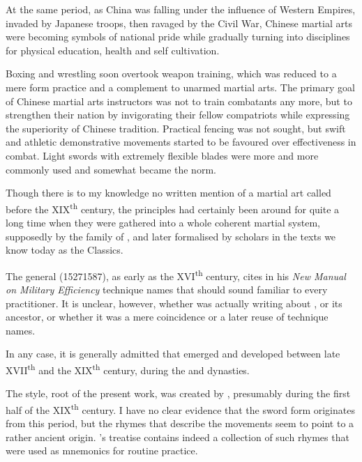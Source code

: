 At the same period, as China was falling under the influence of Western Empires, invaded by Japanese troops, then ravaged by the Civil War, Chinese martial arts were becoming symbols of national pride while gradually turning into disciplines for physical education, health and self cultivation.

Boxing and wrestling soon overtook weapon training, which was reduced to a mere form practice and a complement to unarmed martial arts. 
The primary goal of Chinese martial arts instructors was not to train combatants any more, but to strengthen their nation by invigorating their fellow compatriots while expressing the superiority of Chinese tradition.
Practical fencing was not sought, but swift and athletic demonstrative movements started to be favoured over effectiveness in combat.
Light swords with extremely flexible blades were more and more commonly used and somewhat became the norm.

Though there is to my knowledge no written mention of a martial art called \Taijiquan{} before the XIX\textsuperscript{th} century, the \Taiji{} principles had certainly been around for quite a long time when they were gathered into a whole coherent martial system, supposedly by the \Chen{} family of \Chenjiagou{}, and later formalised by scholars in the texts we know today as the \Taiji{} Classics.

The general \QiJiguang{} (1527\textendash{}1587), as early as the XVI\textsuperscript{th} century, cites in his \textit{New Manual on Military Efficiency} technique names that should sound familiar to every \Taijiquan{} practitioner.
It is unclear, however, whether \QiJiguang{} was actually writing about \Taijiquan{}, or its ancestor, or whether it was a mere coincidence or a later reuse of technique names.

In any case, it is generally admitted that \Taijiquan{} emerged and developed between late XVII\textsuperscript{th} and the  XIX\textsuperscript{th} century, during the \Ming{} and \Qing{} dynasties.

The \Yangjia{} \Michuan{} style, root of the present work, was created by \Yang{} \Luchan{}, presumably during the first half of the XIX\textsuperscript{th} century.
I have no clear evidence that the \Yangjia{} \Michuan{} \Kunlun{} sword form originates from this period, but the rhymes that describe the movements seem to point to a rather ancient origin.
\QiJiguang{}'s treatise contains indeed a collection of such rhymes that were used as mnemonics for routine practice.

